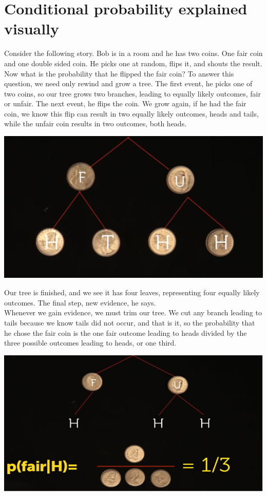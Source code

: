 \documentclass{report}
\begin{document}
\section{Conditional probability explained visually}
Consider the following story. 
Bob is in a room and he has two coins. One fair coin and one double sided coin. He picks one at random, flips it, and shouts the result.  Now what is the probability that he flipped the fair coin? To answer this question, we need only rewind and grow a tree. The first event, he picks one of two coins, so our tree grows two branches, leading to equally likely outcomes, fair or unfair. The next event, he flips the coin. We grow again, if he had the fair coin, we know this flip can result in two equally likely outcomes, heads and tails, while the unfair coin results in two outcomes, both heads.
 \begin{center}
	\includegraphics[scale=1]{74.png}
\end{center}
Our tree is finished, and we see it has four leaves, representing four equally likely outcomes. The final step, new evidence, he says. \\
Whenever we gain evidence, we must trim our tree. We cut any branch leading to tails because we know tails did not occur, and that is it, so the probability that he chose the fair coin is the one fair outcome leading to heads divided by the three possible outcomes leading to heads, or one third.
 \begin{center}
	\includegraphics[scale=1]{75.png}
\end{center}
\end{document}
